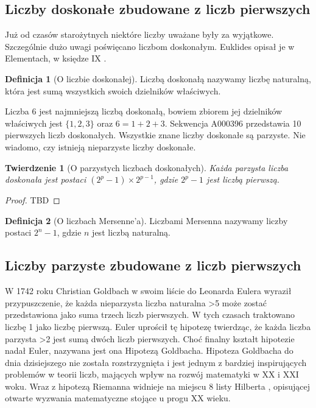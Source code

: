 \documentclass[10pt,onecolumn]{article}
\newtheorem{theorem}{Twierdzenie}
\theoremstyle{definition}
\newtheorem{definition}{Definicja}
\theoremstyle{hypothesis}
\theoremstyle{capability}
\begin{document}
\subsection{Liczby doskonałe zbudowane z liczb pierwszych}

Już od czasów starożytnych niektóre liczby uważane były za wyjątkowe. Szczególnie dużo uwagi poświęcano liczbom doskonałym. Euklides opisał je w Elementach, w księdze IX \cite{euklides}.

\begin{definition} [O liczbie doskonałej]
Liczbą doskonałą nazywamy liczbę naturalną, która jest sumą wszystkich swoich dzielników właściwych.
\end{definition}

Liczba $6$ jest najmniejszą liczbą doskonałą, bowiem zbiorem jej dzielników właściwych jest $\lbrace 1, 2, 3 \rbrace$ oraz $6 = 1 + 2 +3$. Sekwencja A000396 przedstawia 10 pierwszych liczb doskonałych. Wszystkie znane liczby doskonałe są parzyste. Nie wiadomo, czy istnieją nieparzyste liczby doskonałe.

\begin{theorem}[O parzystych liczbach doskonałych]
Każda parzysta liczba doskonała jest postaci $(2^p - 1) \times 2^{p - 1}$, gdzie $2^p - 1$ jest liczbą pierwszą.
\end{theorem}

\begin{proof}
TBD
\end{proof}

\begin{definition} [O liczbach Mersenne'a]
Liczbami Mersenna nazywamy liczby postaci $2^n - 1$, gdzie $n$ jest liczbą naturalną.
\end{definition}

\subsection{Liczby parzyste zbudowane z liczb pierwszych}

W 1742 roku Christian Goldbach w swoim liście do Leonarda Eulera \cite{goldbach1742} wyraził przypuszczenie, że każda nieparzysta liczba naturalna \textgreater 5 może zostać przedstawiona jako suma trzech liczb pierwszych. W tych czasach traktowano liczbę 1 jako liczbę pierwszą. Euler uprościł tę hipotezę twierdząc, że każda liczba parzysta \textgreater 2 jest sumą dwóch liczb pierwszych. Choć finalny kształt hipotezie nadał Euler, nazywana jest ona Hipotezą Goldbacha. Hipoteza Goldbacha do dnia dzisiejszego nie została rozstrzygnięta i jest jednym z bardziej inspirujących problemów w teorii liczb, mających wpływ na rozwój matematyki w XX i XXI woku. Wraz z hipotezą Riemanna widnieje na miejscu 8 listy Hilberta \cite{hilbert1900}, opisującej otwarte wyzwania matematyczne stojące u progu XX wieku.
\end{document}

